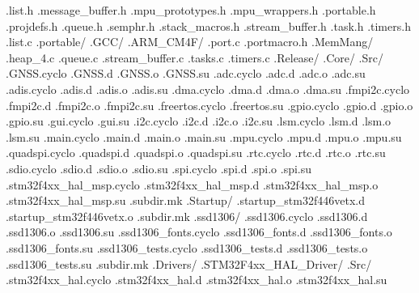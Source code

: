 \documentclass{article}
\begin{document}
{              .list.h
              .message_buffer.h
              .mpu_prototypes.h
              .mpu_wrappers.h
              .portable.h
              .projdefs.h
              .queue.h
              .semphr.h
              .stack_macros.h
              .stream_buffer.h
              .task.h
              .timers.h
            .list.c
            .portable/
              .GCC/
                .ARM_CM4F/
                  .port.c
                  .portmacro.h
              .MemMang/
                .heap_4.c
            .queue.c
            .stream_buffer.c
            .tasks.c
            .timers.c
    .Release/
      .Core/
        .Src/
          .GNSS.cyclo
          .GNSS.d
          .GNSS.o
          .GNSS.su
          .adc.cyclo
          .adc.d
          .adc.o
          .adc.su
          .adis.cyclo
          .adis.d
          .adis.o
          .adis.su
          .dma.cyclo
          .dma.d
          .dma.o
          .dma.su
          .fmpi2c.cyclo
          .fmpi2c.d
          .fmpi2c.o
          .fmpi2c.su
          .freertos.cyclo
          .freertos.su
          .gpio.cyclo
          .gpio.d
          .gpio.o
          .gpio.su
          .gui.cyclo
          .gui.su
          .i2c.cyclo
          .i2c.d
          .i2c.o
          .i2c.su
          .lsm.cyclo
          .lsm.d
          .lsm.o
          .lsm.su
          .main.cyclo
          .main.d
          .main.o
          .main.su
          .mpu.cyclo
          .mpu.d
          .mpu.o
          .mpu.su
          .quadspi.cyclo
          .quadspi.d
          .quadspi.o
          .quadspi.su
          .rtc.cyclo
          .rtc.d
          .rtc.o
          .rtc.su
          .sdio.cyclo
          .sdio.d
          .sdio.o
          .sdio.su
          .spi.cyclo
          .spi.d
          .spi.o
          .spi.su
          .stm32f4xx_hal_msp.cyclo
          .stm32f4xx_hal_msp.d
          .stm32f4xx_hal_msp.o
          .stm32f4xx_hal_msp.su
          .subdir.mk
        .Startup/
          .startup_stm32f446vetx.d
          .startup_stm32f446vetx.o
          .subdir.mk
        .ssd1306/
          .ssd1306.cyclo
          .ssd1306.d
          .ssd1306.o
          .ssd1306.su
          .ssd1306_fonts.cyclo
          .ssd1306_fonts.d
          .ssd1306_fonts.o
          .ssd1306_fonts.su
          .ssd1306_tests.cyclo
          .ssd1306_tests.d
          .ssd1306_tests.o
          .ssd1306_tests.su
          .subdir.mk
      .Drivers/
        .STM32F4xx_HAL_Driver/
          .Src/
            .stm32f4xx_hal.cyclo
            .stm32f4xx_hal.d
            .stm32f4xx_hal.o
            .stm32f4xx_hal.su
}
\end{document}
